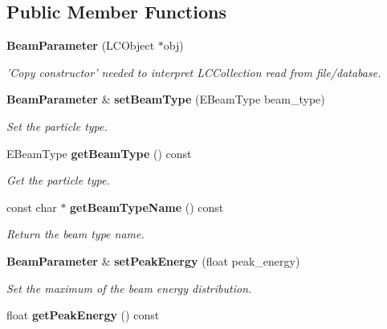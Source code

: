 \subsection*{Public Member Functions}
\begin{DoxyCompactItemize}
\item 
{\bf BeamParameter} (LCObject $\ast$obj)\label{classCALICE_1_1BeamParameter_ac34c61a0ff07d533fa175cdea702b8fe}

\begin{DoxyCompactList}\small\item\em 'Copy constructor' needed to interpret LCCollection read from file/database. \item\end{DoxyCompactList}\item 
{\bf BeamParameter} \& {\bf setBeamType} (EBeamType beam\_\-type)\label{classCALICE_1_1BeamParameter_a91a84f9a224e2b2840fe1aa1e8bab3ec}

\begin{DoxyCompactList}\small\item\em Set the particle type. \item\end{DoxyCompactList}\item 
EBeamType {\bf getBeamType} () const \label{classCALICE_1_1BeamParameter_af8ed22618fedce8bd2840c658ed79ee0}

\begin{DoxyCompactList}\small\item\em Get the particle type. \item\end{DoxyCompactList}\item 
const char $\ast$ {\bf getBeamTypeName} () const \label{classCALICE_1_1BeamParameter_ae2ffbfa7c92c6057139bd4a8b5b1fe8c}

\begin{DoxyCompactList}\small\item\em Return the beam type name. \item\end{DoxyCompactList}\item 
{\bf BeamParameter} \& {\bf setPeakEnergy} (float peak\_\-energy)\label{classCALICE_1_1BeamParameter_a9868e1e09ffff9f945faa8427f5f5ef5}

\begin{DoxyCompactList}\small\item\em Set the maximum of the beam energy distribution. \item\end{DoxyCompactList}\item 
float {\bf getPeakEnergy} () const \label{classCALICE_1_1BeamParameter_aecdce6fd9dc5911ea36a41a73ed04c72}


\end{DoxyCompactItemize}
